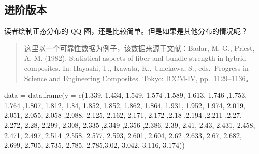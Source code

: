 \documentclass[
]{book}
\newenvironment{Shaded}{\begin{snugshade}}{\end{snugshade}}
\newcommand{\FloatTok}[1]{\textcolor[rgb]{0.00,0.00,0.81}{#1}}
\newcommand{\FunctionTok}[1]{\textcolor[rgb]{0.00,0.00,0.00}{#1}}
\newcommand{\NormalTok}[1]{#1}
\newcommand{\OtherTok}[1]{\textcolor[rgb]{0.56,0.35,0.01}{#1}}
\newcommand{\StringTok}[1]{\textcolor[rgb]{0.31,0.60,0.02}{#1}}
\begin{document}
\hypertarget{ux8fdbux9636ux7248ux672c}{%
\subsection{进阶版本}\label{ux8fdbux9636ux7248ux672c}}

读者绘制正态分布的 QQ 图，还是比较简单。但是如果是其他分布的情况呢？

\begin{quote}
这里以一个可靠性数据为例子，该数据来源于文献：Badar, M. G., Priest, A. M. (1982). Statistical aspects of fiber and bundle strength in hybrid composites. In: Hayashi, T., Kawata, K., Umekawa, S., eds.~Progress in Science and Engineering Composites. Tokyo: ICCM-IV, pp.~1129--1136。
\end{quote}

\begin{Shaded}
\begin{Highlighting}[]
\NormalTok{data }\OtherTok{=} \FunctionTok{data.frame}\NormalTok{(}\StringTok{\textquotesingle{}y\textquotesingle{}} \OtherTok{=} \FunctionTok{c}\NormalTok{(}\FloatTok{1.339}\NormalTok{, }\FloatTok{1.434}\NormalTok{, }\FloatTok{1.549}\NormalTok{, }\FloatTok{1.574}\NormalTok{ ,}\FloatTok{1.589}\NormalTok{, }\FloatTok{1.613}\NormalTok{, }\FloatTok{1.746}\NormalTok{ ,}\FloatTok{1.753}\NormalTok{, }\FloatTok{1.764}\NormalTok{ ,}\FloatTok{1.807}\NormalTok{, }\FloatTok{1.812}\NormalTok{, }\FloatTok{1.84}\NormalTok{, }\FloatTok{1.852}\NormalTok{, }\FloatTok{1.852}\NormalTok{, }\FloatTok{1.862}\NormalTok{, }\FloatTok{1.864}\NormalTok{, }\FloatTok{1.931}\NormalTok{, }\FloatTok{1.952}\NormalTok{, }\FloatTok{1.974}\NormalTok{, }\FloatTok{2.019}\NormalTok{, }\FloatTok{2.051}\NormalTok{, }\FloatTok{2.055}\NormalTok{, }\FloatTok{2.058}\NormalTok{ ,}\FloatTok{2.088}\NormalTok{, }\FloatTok{2.125}\NormalTok{, }\FloatTok{2.162}\NormalTok{, }\FloatTok{2.171}\NormalTok{, }\FloatTok{2.172}\NormalTok{ ,}\FloatTok{2.18}\NormalTok{ ,}\FloatTok{2.194}\NormalTok{ ,}\FloatTok{2.211}\NormalTok{ ,}\FloatTok{2.27}\NormalTok{, }\FloatTok{2.272}\NormalTok{, }\FloatTok{2.28}\NormalTok{, }\FloatTok{2.299}\NormalTok{, }\FloatTok{2.308}\NormalTok{, }\FloatTok{2.335}\NormalTok{ ,}\FloatTok{2.349}\NormalTok{ ,}\FloatTok{2.356}\NormalTok{ ,}\FloatTok{2.386}\NormalTok{, }\FloatTok{2.39}\NormalTok{, }\FloatTok{2.41}\NormalTok{, }\FloatTok{2.43}\NormalTok{, }\FloatTok{2.431}\NormalTok{, }\FloatTok{2.458}\NormalTok{, }\FloatTok{2.471}\NormalTok{, }\FloatTok{2.497}\NormalTok{, }\FloatTok{2.514}\NormalTok{ ,}\FloatTok{2.558}\NormalTok{, }\FloatTok{2.577}\NormalTok{, }\FloatTok{2.593}\NormalTok{, }\FloatTok{2.601}\NormalTok{, }\FloatTok{2.604}\NormalTok{, }\FloatTok{2.62}\NormalTok{ ,}\FloatTok{2.633}\NormalTok{, }\FloatTok{2.67}\NormalTok{, }\FloatTok{2.682}\NormalTok{, }\FloatTok{2.699}\NormalTok{, }\FloatTok{2.705}\NormalTok{, }\FloatTok{2.735}\NormalTok{, }\FloatTok{2.785}\NormalTok{, }\FloatTok{2.785}\NormalTok{,}\FloatTok{3.02}\NormalTok{, }\FloatTok{3.042}\NormalTok{, }\FloatTok{3.116}\NormalTok{, }\FloatTok{3.174}\NormalTok{))}
\end{Highlighting}
\end{Shaded}
\end{document}
